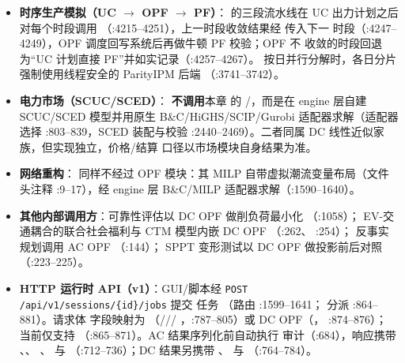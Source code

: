 \begin{itemize}
  \item \textbf{时序生产模拟（UC $\to$ OPF $\to$ PF）}：
         的三段流水线在
        UC 出力计划之后对每个时段调用 
        （:4215--4251），上一时段收敛结果经  传入下一
        时段（:4247--4249），OPF 调度回写系统后再做牛顿 PF 校验；OPF 不
        收敛的时段回退为“UC 计划直接 PF”并如实记录（:4257--4267）。
        按日并行分解时，各日分片强制使用线程安全的 ParityIPM 后端
        （:3741--3742）。
  \item \textbf{电力市场（SCUC/SCED）}：
         \textbf{不调用}本章
        的 /，而是在
        engine 层自建 SCUC/SCED 模型并用原生 B\&C/HiGHS/SCIP/Gurobi
        适配器求解（适配器选择 :803--839，SCED 装配与校验
        :2440--2469）。二者同属 DC 线性近似家族，但实现独立，价格/结算
        口径以市场模块自身结果为准。
  \item \textbf{网络重构}：
        同样不经过 OPF 模块：其 MILP 自带虚拟潮流变量布局（文件头注释
        :9--17），经 engine 层 B\&C/MILP 适配器求解（:1590--1640）。
  \item \textbf{其他内部调用方}：可靠性评估以 DC OPF 做削负荷最小化
        （:1058）；
        EV-交通耦合的联合社会福利与 CTM 模型内嵌 DC OPF
        （:262、
        :254）；
        反事实规划调用 AC OPF
        （\allowbreak :144）；
        SPPT 变形测试以 DC OPF 做投影前后对照
        （\allowbreak :223--225）。
  \item \textbf{HTTP 运行时 API（v1）}：GUI/脚本经
        \texttt{POST /api/v1/sessions/\{id\}/jobs} 提交
         任务
        （路由 :1599--1641；
        分派 :864--881）。请求体  字段映射为
        （///
        ，:787--805）或 DC OPF（，
        :874--876）； 当前仅支持
        （:865--871）。AC 结果序列化前自动执行
         审计（:684），响应携带
        、、
        、 与
        （:712--736）；DC 结果另携带 、
         与 （:764--784）。
\end{itemize}

